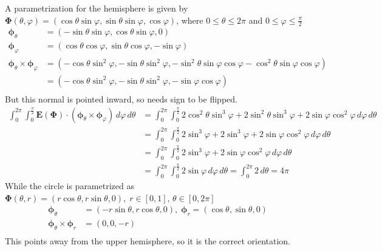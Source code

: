 \documentclass{article}
\begin{document}
\begin{enumerate}
                A parametrization for the hemisphere is given by $\boldsymbol \Phi (\theta, \varphi) = (\cos\theta \sin\varphi, \sin\theta \sin\varphi, \cos\varphi)$, where $0 \leq \theta \leq 2\pi$ and $\displaystyle 0 \leq \varphi \leq \frac{\pi}{2}$
                \begin{align*}
                \boldsymbol \phi_{\theta} &= (- \sin \theta \sin \varphi, \cos \theta \sin \varphi, 0)\\
                \boldsymbol \phi_{\varphi} &= (\cos \theta \cos \varphi, \sin \theta \cos \varphi, -\sin \varphi) \\
                \boldsymbol \phi_\theta \times \boldsymbol \phi_\varphi &= (-\cos\theta \sin^2\varphi, -\sin\theta \sin^2\varphi, - \sin^2\theta \sin\varphi \cos\varphi - \cos^2\theta \sin \varphi \cos \varphi) \\ 
                &= (-\cos\theta \sin^2\varphi, -\sin\theta \sin^2\varphi, - \sin\varphi \cos\varphi ) \\ 
                \end{align*} 
                But this normal is pointed inward, so needs sign to be flipped.
                \begin{align*}
                \int_0^{2\pi} \int_0^{\frac{\pi}{2}} \boldsymbol E ( \boldsymbol \Phi ) \cdot ( \boldsymbol \phi_{\theta} \times \boldsymbol \phi_{\varphi}) \, d\varphi \, d\theta &= \int_0^{2\pi} \int_0^{\frac{\pi}{2}} 2 \cos^2 \theta \sin^3 \varphi + 2\sin^2 \theta \sin^3 \varphi + 2 \sin \varphi \cos^2 \varphi \, d\varphi \, d\theta \\
                &= \int_0^{2\pi} \int_0^{\frac{\pi}{2}} 2 \sin^3 \varphi + 2\sin^3 \varphi + 2 \sin \varphi \cos^2 \varphi \, d\varphi \, d\theta \\
                &= \int_0^{2\pi} \int_0^{\frac{\pi}{2}} 2\sin^3 \varphi + 2 \sin \varphi \cos^2 \varphi \, d\varphi \, d\theta \\
                &= \int_0^{2\pi} \int_0^{\frac{\pi}{2}} 2\sin \varphi \, d\varphi \, d\theta = \int_0^{2\pi} 2\, d\theta  = 4 \pi
                \end{align*}
                While the circle is parametrized as $\boldsymbol \Phi (\theta, r) = (r\cos \theta, r\sin \theta, 0),\; r \in [0,1],\, \theta \in [0,2\pi]$
                \begin{align*}
                \boldsymbol \phi_{\theta} &= (-r\sin \theta, r\cos \theta, 0) ,\; \boldsymbol \phi_{r} = (\cos\theta, \sin\theta, 0)\\
                \boldsymbol \phi_\theta \times \boldsymbol \phi_r &= (0,0,-r) \\ 
                \end{align*} 
                This points away from the upper hemisphere, so it is the correct orientation.


\end{enumerate}
\end{document}
